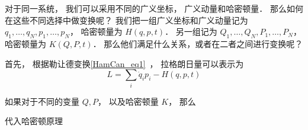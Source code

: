 
\begin{issues}
\issueDraft
\end{issues}


对于同一系统， 我们可以采用不同的广义坐标， 广义动量和哈密顿量． 那么如何在这些不同选择中做变换呢？ 我们把一组广义坐标和广义动量记为 $q_1,\dots, q_N, p_1, \dots, p_N$， 哈密顿量为 $H(q, p, t)$． 另一组记为 $Q_1,\dots, Q_N, P_1, \dots, P_N$， 哈密顿量为 $K(Q, P, t)$． 那么他们满足什么关系，或者在二者之间进行变换呢？

首先， 根据勒让德变换\autoref{HamCan_eq1}~， 拉格朗日量可以表示为
\begin{equation}
L = \sum_i \dot q_i p_i - H(q, p, t)
\end{equation}

如果对于不同的变量 $Q, P$， 以及哈密顿量 $K$， 那么

代入哈密顿原理